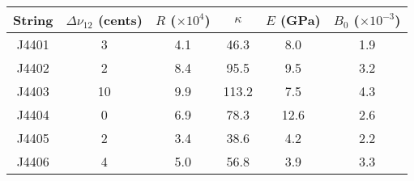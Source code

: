 \begin{tabular}{cccccc}
\toprule
String &  $\Delta \nu_{12}$ (cents) &  $R$ ($\times 10^4$) &  $\kappa$ &  $E$ (GPa) &  $B_0$ ($\times 10^{-3}$) \\
\midrule
 J4401 &                          3 &                  4.1 &      46.3 &        8.0 &                       1.9 \\
 J4402 &                          2 &                  8.4 &      95.5 &        9.5 &                       3.2 \\
 J4403 &                         10 &                  9.9 &     113.2 &        7.5 &                       4.3 \\
 J4404 &                          0 &                  6.9 &      78.3 &       12.6 &                       2.6 \\
 J4405 &                          2 &                  3.4 &      38.6 &        4.2 &                       2.2 \\
 J4406 &                          4 &                  5.0 &      56.8 &        3.9 &                       3.3 \\
\bottomrule
\end{tabular}

